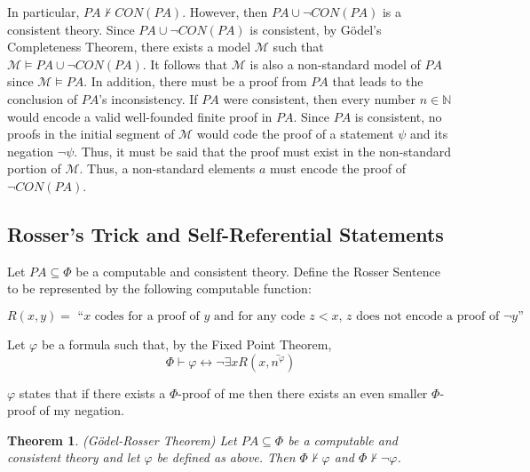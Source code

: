 \documentclass[a4paper,10pt]{article}
\newtheorem{theorem}{Theorem}[section]
\let\phi\varphi
\newcommand*\phibar{\bar{n^{\phi}}}
\newcommand*\prf{\vdash}
\newcommand*\mo{\vDash}
\newcommand*\biject{\leftrightarrow}
\begin{document}
  In particular, $PA \not\prf CON(PA)$. However, then $PA \cup \neg CON(PA)$ is a consistent theory. Since $PA \cup \neg CON(PA)$ is consistent, by G\"{o}del's Completeness Theorem, there exists a model $\mathcal{M}$ such that
  $\mathcal{M} \mo PA \cup \neg CON(PA)$. It follows that $\mathcal{M}$ is also a non-standard model of $PA$ since $\mathcal{M} \mo PA$. In addition, there must be a proof from $PA$ that leads to the conclusion of $PA$'s inconsistency. If $PA$ were consistent, then every number
  $n \in \mathbb{N}$ would encode a valid well-founded finite proof in $PA$. Since $PA$ is consistent, no proofs in the initial segment of $\mathcal{M}$ would code the proof of a statement $\psi$ and its negation $\neg\psi$. Thus, it must be said that the proof must exist in the non-standard portion of $\mathcal{M}$. Thus, a non-standard elements
  $a$ must encode the proof of $\neg CON(PA)$.

  \subsection{Rosser's Trick and Self-Referential Statements}
  
  Let $PA \subseteq \Phi$ be a computable and consistent theory. Define the Rosser Sentence to be represented by the following computable function:
  
  
  \begin{equation*}
   R(x,y) = \text{ ``$x$ codes for a proof of $y$ and for any code $z < x$, $z$ does not encode a proof of $\neg y$''} 
  \end{equation*}
  
  Let $\phi$ be a formula such that, by the Fixed Point Theorem,
  \begin{equation*}
   \Phi \prf \phi \biject \neg\exists x R(x,\phibar)
  \end{equation*}

  $\phi$ states that if there exists a $\Phi$-proof of me then there exists an even smaller $\Phi$-proof of my negation.
  
  \begin{theorem}
   (G\"{o}del-Rosser Theorem) Let $PA \subseteq \Phi$ be a computable and consistent theory and let $\phi$ be defined as above. Then $\Phi \not\prf \phi$ and $\Phi \not\prf \neg\phi$.
  \end{theorem}
  
\end{document}
